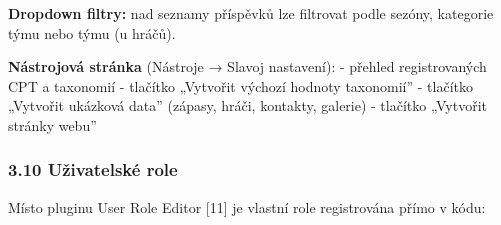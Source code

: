 \textbf{Dropdown filtry:} nad seznamy příspěvků lze filtrovat podle
sezóny, kategorie týmu nebo týmu (u hráčů).

\textbf{Nástrojová stránka} (Nástroje → Slavoj nastavení): - přehled
registrovaných CPT a taxonomií - tlačítko „Vytvořit výchozí hodnoty
taxonomií'' - tlačítko „Vytvořit ukázková data'' (zápasy, hráči,
kontakty, galerie) - tlačítko „Vytvořit stránky webu''

\subsubsection{3.10 Uživatelské role}\label{uux17eivatelskuxe9-role}

Místo pluginu User Role Editor {[}11{]} je vlastní role registrována
přímo v kódu:

\begin{Shaded}
\begin{Highlighting}[]
\OtherTok{,} \OtherTok{,} \NormalTok{(}
    \NormalTok{                   =\textgreater{} }\OtherTok{,}
    \NormalTok{             =\textgreater{} }\OtherTok{,}
    \NormalTok{      =\textgreater{} }\OtherTok{,}
    \NormalTok{          =\textgreater{} }\OtherTok{,}
    \NormalTok{           =\textgreater{} }\OtherTok{,}
    \NormalTok{      =\textgreater{} }\OtherTok{,}
\NormalTok{))}\OtherTok{;}
\end{Highlighting}
\end{Shaded}

